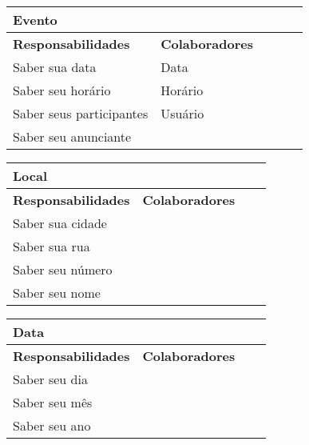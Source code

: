 \documentclass{article}
\begin{document}
    
    \begin{center}
   	 \begin{tabular}{|p{0.5\linewidth}|p{0.5\linewidth}|}
\hline
 	\multicolumn{2}{|p{\textwidth}|}{
{\large \textbf{Evento}}
}  \\
\hline
\textbf{Responsabilidades} & \textbf{Colaboradores} \\ 
\hline
  	Saber sua data & Data \\
  	\hline
  	Saber seu horário &  Horário\\
  	\hline
  	Saber seus participantes &  Usuário \\
  	\hline
  	Saber seu anunciante &  \\
  	\hline
   	\end{tabular} 
    \end{center}
    
    
    \begin{center}
   	 \begin{tabular}{|p{0.5\linewidth}|p{0.5\linewidth}|}
\hline
 	\multicolumn{2}{|p{\textwidth}|}{
{\large \textbf{Local}}
}  \\
\hline
\textbf{Responsabilidades} & \textbf{Colaboradores} \\ 
\hline
  	Saber sua cidade &  \\
  	\hline
  	Saber sua rua &  \\
  	\hline
  	Saber seu número &  \\
  	\hline
  	Saber seu nome &  \\
  	\hline
   	\end{tabular} 
    \end{center}
    
    
    \begin{center}
   	 \begin{tabular}{|p{0.5\linewidth}|p{0.5\linewidth}|}
\hline
 	\multicolumn{2}{|p{\textwidth}|}{
{\large \textbf{Data}}
}  \\
\hline
\textbf{Responsabilidades} & \textbf{Colaboradores} \\ 
\hline
  	Saber seu dia &  \\
  	\hline
  	Saber seu mês &  \\
  	\hline
  	Saber seu ano &  \\
  	\hline
   	\end{tabular} 
    \end{center}
    
\end{document}
